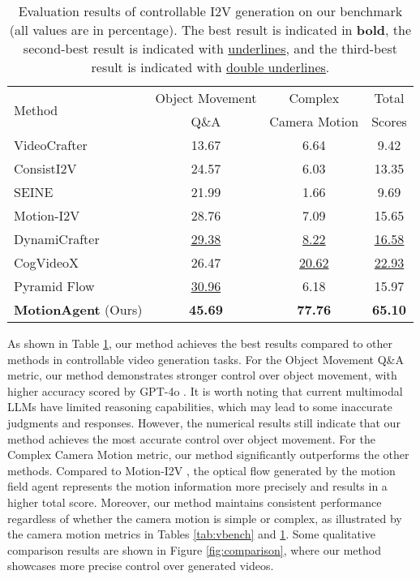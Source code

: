 \begin{table}[t]
  \centering
  \resizebox{0.95\columnwidth}{!} %
  {
  \begin{tabular}{lccc}
    \toprule
    \multirow{2}{*}{Method} & Object Movement & Complex & Total\\
     & Q\&A & Camera Motion & Scores\\
    \midrule
    VideoCrafter \cite{chen2023videocrafter1} & 13.67 & 6.64 & 9.42 \\
    ConsistI2V \cite{ren2024consisti2v} & 24.57 & 6.03 & 13.35\\
    SEINE \cite{chen2023seine} & 21.99 & 1.66 & 9.69\\
    Motion-I2V \cite{shi2024motion} & 28.76 & 7.09 & 15.65\\
    DynamiCrafter \cite{xing2025dynamicrafter} & \underline{\underline{29.38}} & \underline{\underline{8.22}} & \underline{\underline{16.58}}\\
    CogVideoX \cite{yang2024cogvideox} & 26.47 & \underline{20.62} & \underline{22.93}\\
    Pyramid Flow \cite{jin2024pyramidal} & \underline{30.96} & 6.18 & 15.97\\
    \textbf{MotionAgent} (Ours) & \textbf{45.69} & \textbf{77.76} & \textbf{65.10}\\
    \bottomrule
    \end{tabular}
    }
    \caption{Evaluation results of controllable I2V generation on our benchmark (all values are in percentage). The best result is indicated in \textbf{bold}, the second-best result is indicated with \underline{underlines}, and the third-best result is indicated with \underline{\underline{double underlines}}.}
    \label{tab:control}
\end{table}

As shown in Table \ref{tab:control}, our method achieves the best results compared to other methods in controllable video generation tasks. For the Object Movement Q\&A metric, our method demonstrates stronger control over object movement, with higher accuracy scored by GPT-4o \cite{Chatgpt}. It is worth noting that current multimodal LLMs have limited reasoning capabilities, which may lead to some inaccurate judgments and responses. However, the numerical results still indicate that our method achieves the most accurate control over object movement. For the Complex Camera Motion metric, our method significantly outperforms the other methods. Compared to Motion-I2V \cite{shi2024motion}, the optical flow generated by the motion field agent represents the motion information more precisely and results in a higher total score. Moreover, our method maintains consistent performance regardless of whether the camera motion is simple or complex, as illustrated by the camera motion metrics in Tables \ref{tab:vbench} and \ref{tab:control}. Some qualitative comparison results are shown in Figure \ref{fig:comparison}, where our method showcases more precise control over generated videos. 

